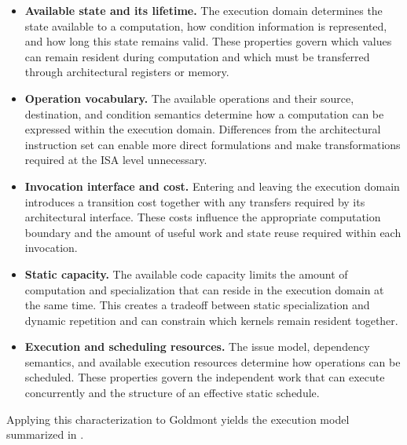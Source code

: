 \documentclass[journal=tches,submission]{iacrtrans}
\begin{document}
\begin{itemize}[itemsep=1pt, parsep=0pt, topsep=1pt, partopsep=0pt]

\item
\textbf{Available state and its lifetime.}
The execution domain determines the state available to a computation, how condition information is represented, and how long this state remains valid.
These properties govern which values can remain resident during computation and which must be transferred through architectural registers or memory.

\item
\textbf{Operation vocabulary.}
The available operations and their source, destination, and condition semantics determine how a computation can be expressed within the execution domain.
Differences from the architectural instruction set can enable more direct formulations and make transformations required at the ISA level unnecessary.

\item
\textbf{Invocation interface and cost.}
Entering and leaving the execution domain introduces a transition cost together with any transfers required by its architectural interface.
These costs influence the appropriate computation boundary and the amount of useful work and state reuse required within each invocation.

\item
\textbf{Static capacity.}
The available code capacity limits the amount of computation and specialization that can reside in the execution domain at the same time.
This creates a tradeoff between static specialization and dynamic repetition and can constrain which kernels remain resident together.

\item
\textbf{Execution and scheduling resources.}
The issue model, dependency semantics, and available execution resources determine how operations can be scheduled.
These properties govern the independent work that can execute concurrently and the structure of an effective static schedule.

\end{itemize}

Applying this characterization to Goldmont yields the execution model summarized in .
\end{document}
